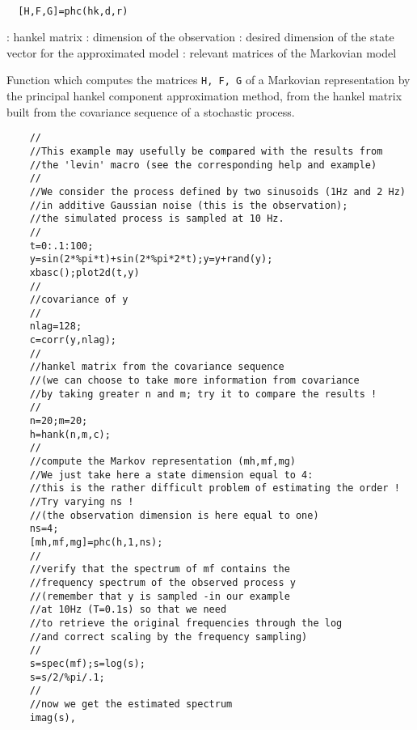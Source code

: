 \begin{mandesc}
   \\ %
\end{mandesc}
\begin{calling_sequence}
\begin{verbatim}
  [H,F,G]=phc(hk,d,r)  
\end{verbatim}
\end{calling_sequence}
\begin{parameters}
  \begin{varlist}
    : hankel matrix
    : dimension of the observation
    : desired dimension of the state vector for the approximated model
    : relevant matrices of the Markovian model
  \end{varlist}
\end{parameters}
\begin{mandescription}
  Function which computes the matrices \verb!H, F, G! of a Markovian 
  representation by the principal hankel
  component approximation method, from the hankel matrix built
  from the covariance sequence of a stochastic process.
\end{mandescription}
\begin{examples}
  \begin{Verbatim}
    //
    //This example may usefully be compared with the results from 
    //the 'levin' macro (see the corresponding help and example)
    //
    //We consider the process defined by two sinusoids (1Hz and 2 Hz) 
    //in additive Gaussian noise (this is the observation); 
    //the simulated process is sampled at 10 Hz.
    //
    t=0:.1:100;
    y=sin(2*%pi*t)+sin(2*%pi*2*t);y=y+rand(y);
    xbasc();plot2d(t,y)
    //
    //covariance of y
    //
    nlag=128;
    c=corr(y,nlag);
    //
    //hankel matrix from the covariance sequence
    //(we can choose to take more information from covariance
    //by taking greater n and m; try it to compare the results !
    //
    n=20;m=20;
    h=hank(n,m,c);
    //
    //compute the Markov representation (mh,mf,mg)
    //We just take here a state dimension equal to 4:
    //this is the rather difficult problem of estimating the order !
    //Try varying ns ! 
    //(the observation dimension is here equal to one)
    ns=4;
    [mh,mf,mg]=phc(h,1,ns);
    //
    //verify that the spectrum of mf contains the 
    //frequency spectrum of the observed process y
    //(remember that y is sampled -in our example 
    //at 10Hz (T=0.1s) so that we need 
    //to retrieve the original frequencies through the log 
    //and correct scaling by the frequency sampling)
    //
    s=spec(mf);s=log(s);
    s=s/2/%pi/.1;
    //
    //now we get the estimated spectrum
    imag(s),
  \end{Verbatim}
\end{examples}
\begin{manseealso}
\end{manseealso}
